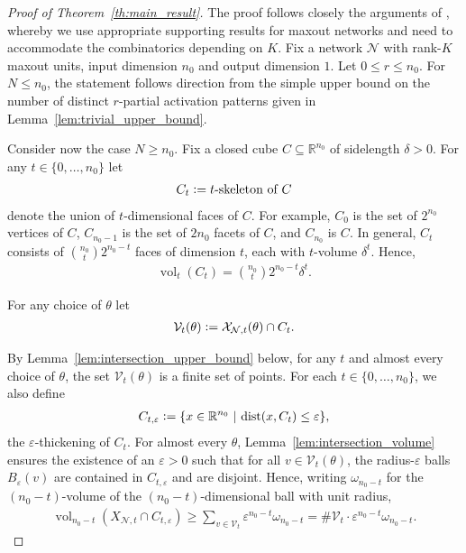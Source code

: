 \documentclass{article}
\theoremstyle{definition}
\newcommand{\defeq}{\vcentcolon=}
\newcommand{\dist}{\text{\normalfont dist}}
\newcommand{\net}{\mathcal{N}}
\newcommand{\nin}{n_0}
\newcommand{\vol}{\operatorname{vol}}
\begin{document}
\mainresulttheorem*
\begin{proof}[Proof of Theorem~\ref{th:main_result}] 
    The proof follows closely the arguments of \citet[Proof of Theorem~10]{NIPS2019_8328}, whereby we use appropriate supporting results for maxout networks and need to accommodate the combinatorics depending on $K$. 
    Fix a network $\net$ with rank-$K$ maxout units, input dimension $\nin$ and output dimension $1$. Let $0\leq r\leq \nin$. 
    For $N \leq \nin$, the statement follows direction from the simple upper bound on the number of distinct $r$-partial activation patterns given in Lemma~\ref{lem:trivial_upper_bound}. 
    
    Consider now the case $N \geq \nin$. 
    Fix a closed cube $C \subseteq \mathbb{R}^{\nin}$ of sidelength $\delta > 0$. For any $t \in \{0, \dots, \nin\}$ let 
    \begin{align*}
        C_t \defeq t\text{\normalfont-skeleton of } C 
    \end{align*}
    denote the union of $t$-dimensional faces of $C$. 
    For example, $C_0$ is the set of $2^{\nin}$ vertices of $C$,  $C_{\nin - 1}$ is the set of $2 \nin$ facets of $C$, and $C_{\nin}$ is $C$. 
    In general, $C_t$ consists of $\binom{\nin}{t} 2^{\nin-t}$ faces of dimension $t$, each with $t$-volume $\delta^t$. 
    Hence, 
    \begin{align}
        \vol_t(C_t) = \binom{\nin}{t} 2^{\nin-t} \delta^t.
        \label{eq:volt_ct}
    \end{align}
    
    For any choice of $\theta$ let 
    \begin{align*}
    \mathcal{V}_t(\theta) \defeq \mathcal{X}_{\net, t}(\theta) \cap C_t.
    \end{align*}
    
    By Lemma~\ref{lem:intersection_upper_bound} below, for any $t$ and almost every choice of $\theta$, the set $\mathcal{V}_t(\theta)$ is a finite set of points.
    For each $t \in \{0, \dots, \nin\}$, we also define 
    \begin{align*}
        C_{t, \varepsilon} \defeq \{ x \in \mathbb{R}^{\nin} \ | \ \dist(x, C_t ) \leq \varepsilon \}, 
    \end{align*}
    the $\varepsilon$-thickening of $C_t$. 
    For almost every $\theta$, Lemma~\ref{lem:intersection_volume} ensures the existence of an $\varepsilon > 0$ such that for all $v\in \mathcal{V}_{t}(\theta)$, the radius-$\varepsilon$ balls $B_{\varepsilon}(v)$ are contained in $C_{t,\varepsilon}$ and are disjoint. 
    Hence, writing $\omega_{\nin-t}$ for the $(\nin-t)$-volume of the $(\nin-t)$-dimensional ball with unit radius, 
    \begin{align*}
        \vol_{\nin - t} (X_{\net, t} \cap C_{t, \varepsilon}) \geq \sum\limits_{v \in \mathcal{V}_t} \varepsilon^{\nin - t} \omega_{\nin - t} = \# \mathcal{V}_t \cdot \varepsilon^{\nin - t} \omega_{\nin - t}.
    \end{align*}
    

\end{proof}
\end{document}
